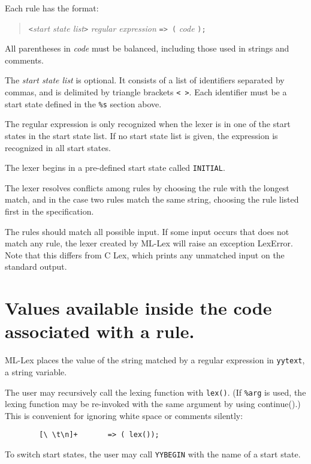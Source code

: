Each rule has the format:

\begin{quote}
       \verb|<|{\it start state list}\verb|>| {\it regular expression} \verb|=> (| {\it code} \verb|);|
\end{quote}

All parentheses in  {\it code}  must be balanced, including those
used in strings and comments.

The {\it start state list} is optional.  It consists of a list of
identifiers separated by commas, and is delimited by triangle
brackets \verb|< >|.  Each identifier must be a start state defined in the
\verb|%s| section above.

The regular expression is only recognized when the lexer is in one of
the start states in the start state list.  If no start state list is
given, the expression is recognized in all start states.

The lexer begins in a pre-defined start state called \verb|INITIAL|.

The lexer resolves conflicts among rules by choosing the rule with
the longest match, and in the case two rules match the same string,
choosing the rule listed first in the specification.

The rules should match all possible input.  If some input occurs that
does not match any rule, the lexer created by ML-Lex will raise an
exception LexError.  Note that this differs from C Lex, which prints
any unmatched input on the standard output.

\section{Values available inside the code associated with a rule.}
\label{avail}

ML-Lex places the value of the string matched by a regular expression
in \verb|yytext|, a string variable.

The user may recursively
call the lexing function with \verb|lex()|.  (If \verb|%arg| is used, the
lexing function may be re-invoked with the same argument by using
continue().) This is convenient for ignoring white space or comments silently:

\begin{verbatim}
        [\ \t\n]+       => ( lex());
\end{verbatim}

To switch start states, the user may call \verb|YYBEGIN| with the name of a
start state.

